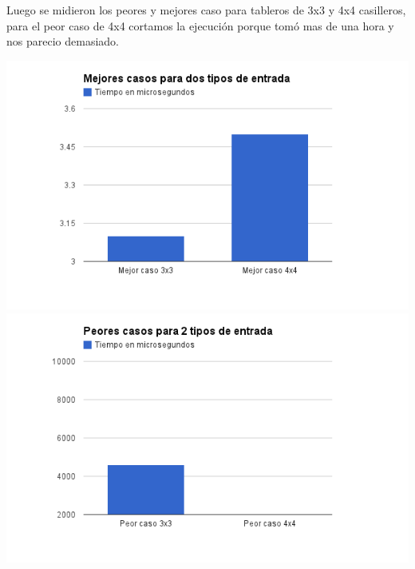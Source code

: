 Luego se midieron los peores y mejores caso para tableros de 3x3 y 4x4 casilleros, para el peor caso de 4x4 cortamos la ejecuci\'on porque tom\'o mas de una hora y nos parecio demasiado.
\begin{center}
	\includegraphics[scale=0.70]{images/ej3_mejor_caso.png}
	\includegraphics[scale=0.70]{images/ej3_peor_caso.png}
\end{center}

